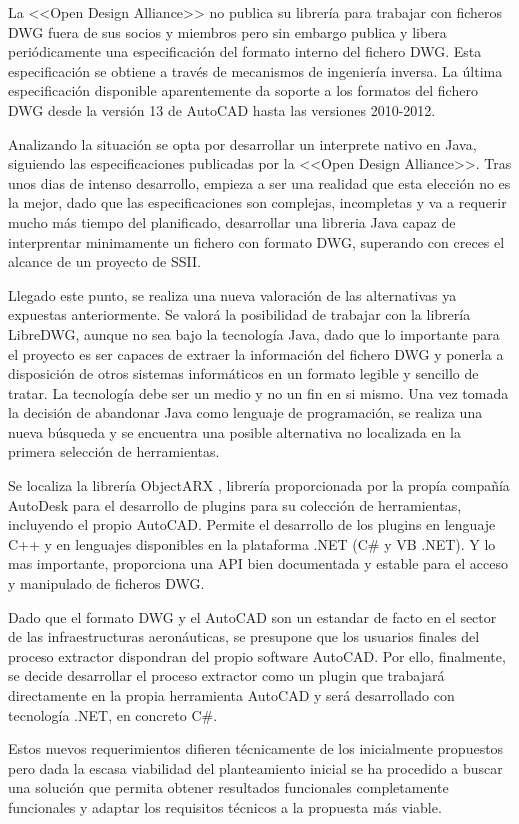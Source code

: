La <<Open Design Alliance>> no publica su librería para trabajar con ficheros DWG fuera de sus socios y miembros pero sin embargo publica y libera periódicamente una especificación del formato interno del fichero DWG. Esta especificación se obtiene a través de mecanismos de ingeniería inversa. La última especificación disponible aparentemente da soporte a los formatos del fichero DWG desde la versión 13 de AutoCAD hasta las versiones 2010-2012. 

Analizando la situación se opta por desarrollar un interprete nativo en Java, siguiendo las especificaciones publicadas por la <<Open Design Alliance>>. Tras unos dias de intenso desarrollo, empieza a ser una realidad que esta elección no es la mejor, dado que las especificaciones son complejas, incompletas y va a requerir mucho más tiempo del planificado, desarrollar una libreria Java capaz de interprentar minimamente un fichero con formato DWG, superando con creces el alcance de un proyecto de SSII.

Llegado este punto, se realiza una nueva valoración de las alternativas ya expuestas anteriormente. Se valorá la posibilidad de trabajar con la librería LibreDWG, aunque no sea bajo la tecnología Java, dado que lo importante para el proyecto es ser capaces de extraer la información del fichero DWG y ponerla a disposición de otros sistemas informáticos en un formato legible y sencillo de tratar. La tecnología debe ser un medio y no un fin en si mismo. Una vez tomada la decisión de abandonar Java como lenguaje de programación, se realiza una nueva búsqueda y se encuentra una posible alternativa no localizada en la primera selección de herramientas. 

Se localiza la librería ObjectARX \cite{ObjectARX}, librería proporcionada por la propía compañía AutoDesk para el desarrollo de plugins para su colección de herramientas, incluyendo el propio AutoCAD. Permite el desarrollo de los plugins en lenguaje C++ y en lenguajes disponibles en la plataforma .NET (C\# y VB .NET). Y lo mas importante, proporciona una API bien documentada y estable para el acceso y manipulado de ficheros DWG.

Dado que el formato DWG y el AutoCAD son un estandar de facto en el sector de las infraestructuras aeronáuticas, se presupone que los usuarios finales del proceso extractor dispondran del propio software AutoCAD. Por ello, finalmente, se decide desarrollar el proceso extractor como un plugin que trabajará directamente en la propia herramienta AutoCAD y será desarrollado con tecnología .NET, en concreto C\#. 

Estos nuevos requerimientos difieren técnicamente de los inicialmente propuestos pero dada la escasa viabilidad del planteamiento inicial se ha procedido a buscar una solución que permita obtener resultados funcionales completamente funcionales y adaptar los requisitos técnicos a la propuesta más viable.

